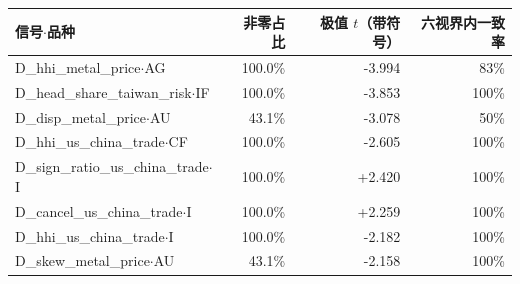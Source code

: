 \begin{tabular}{lrrr}
\toprule
信号$\cdot$品种 & 非零占比 & 极值 $t$（带符号） & 六视界内一致率 \\
\midrule
D\_hhi\_metal\_price$\cdot$AG & 100.0\% & -3.994 & 83\% \\
D\_head\_share\_taiwan\_risk$\cdot$IF & 100.0\% & -3.853 & 100\% \\
D\_disp\_metal\_price$\cdot$AU & 43.1\% & -3.078 & 50\% \\
D\_hhi\_us\_china\_trade$\cdot$CF & 100.0\% & -2.605 & 100\% \\
D\_sign\_ratio\_us\_china\_trade$\cdot$I & 100.0\% & +2.420 & 100\% \\
D\_cancel\_us\_china\_trade$\cdot$I & 100.0\% & +2.259 & 100\% \\
D\_hhi\_us\_china\_trade$\cdot$I & 100.0\% & -2.182 & 100\% \\
D\_skew\_metal\_price$\cdot$AU & 43.1\% & -2.158 & 100\% \\
\bottomrule
\end{tabular}
